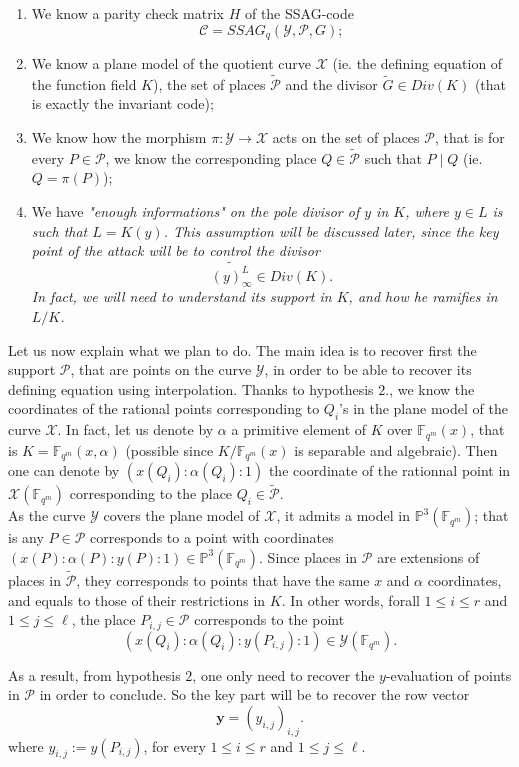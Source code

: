 \documentclass[10pt]{article}
\newcommand{\s}{\vspace{0.3cm}}
\newcommand{\fqm}{\mathbb{F}_{q^m}}
\newcommand{\X}{\mathcal{X}}
\newcommand{\Y}{\mathcal{Y}}
\newcommand{\PR}{\mathcal{P}}
\begin{document}
\begin{enumerate}
\item We know a parity check matrix $H$ of the SSAG-code  \[\mathcal{C} = SSAG_q(\Y,\PR,G) ;\]
\item We know a plane model of the quotient curve $\X$ (ie. the defining equation of the function field $K$), the set of places $\tilde{\PR}$ and the divisor $\tilde{G} \in Div(K)$ (that is exactly the invariant code);
\item We know how the morphism $\pi : \Y \rightarrow \X$ acts on the set of places $\PR$, that is for every $P \in \PR$, we know the corresponding place $Q \in \tilde{\PR}$ such that $P \mid Q$ (ie. $Q=\pi(P)$);
\item We have \it{"enough informations"} \rm on the pole divisor of $y$ in $K$, where $y \in L$ is such that $L=K(y)$. This assumption will be discussed later, since the key point of the attack will be to control the divisor 
\[\widetilde{(y)^L_{\infty}} \in Div(K).\] 
In fact, we will need to understand its support in $K$, and how he ramifies in $L/K$.
\end{enumerate}
\s

Let us now explain what we plan to do. The main idea is to recover first the support $\PR$, that are points on the curve $\Y$, in order to be able to recover its defining equation using interpolation. Thanks to hypothesis $2.$, we know the coordinates of the rational points corresponding to $Q_i$'s in the plane model of the curve $\X$. In fact, let us denote by $\alpha$ a primitive element of $K$ over $\fqm(x)$, that is $K = \fqm(x,\alpha)$ (possible since $K/\fqm(x)$ is separable and algebraic). Then one can denote by $(x(Q_i):\alpha(Q_i):1)$ the coordinate of the rationnal point in $\X(\fqm)$ corresponding to the place $Q_i \in \tilde{\PR}$. \\

As the curve $\Y$ covers the plane model of $\X$, it admits a model in $\mathbb{P}^3(\fqm)$; that is any $P \in \PR$ corresponds to a point with coordinates $(x(P):\alpha(P):y(P):1) \in \mathbb{P}^3(\fqm)$. Since places in $\PR$ are extensions of places in $\tilde{\PR}$, they corresponds to points that have the same $x$ and $\alpha$ coordinates, and equals to those of their restrictions in $K$. In other words, forall $1 \leq i \leq r$ and $1 \leq j \leq \ell$, the place $P_{i,j} \in \PR$ corresponds to the point
\[ (x(Q_i):\alpha(Q_i):y(P_{i,j}):1) \in \Y(\fqm).\]

As a result, from hypothesis $2$, one only need to recover the $y$-evaluation of points in $\PR$ in order to conclude. So the key part will be to recover the row vector
\begin{equation}
\textbf{y} = (y_{i,j})_{i,j}.
\end{equation}
where $y_{i,j} := y(P_{i,j})$, for every $1 \leq i \leq r$ and $1 \leq j \leq \ell$.
\end{document}
